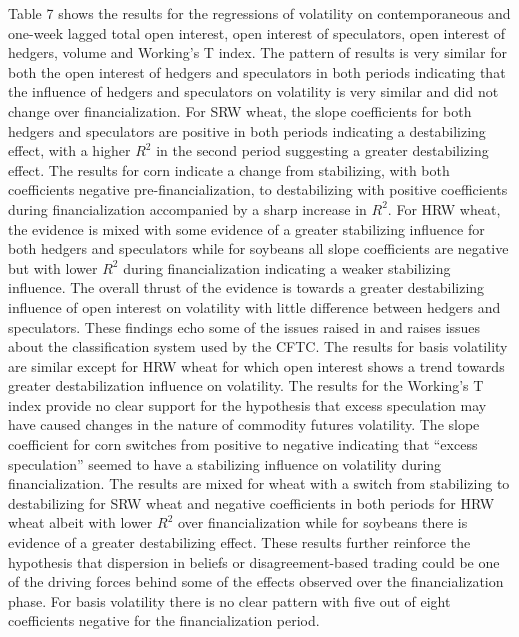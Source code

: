 \documentclass[
]{book}
\begin{document}
Table 7 shows the results for the regressions of volatility on contemporaneous and one-week lagged total open interest, open interest of speculators, open interest of hedgers, volume and Working's T index. The pattern of results is very similar for both the open interest of hedgers and speculators in both periods indicating that the influence of hedgers and speculators on volatility is very similar and did not change over financialization. For SRW wheat, the slope coefficients for both hedgers and speculators are positive in both periods indicating a destabilizing effect, with a higher \(R^{2}\) in the second period suggesting a greater destabilizing effect. The results for corn indicate a change from stabilizing, with both coefficients negative pre-financialization, to destabilizing with positive coefficients during financialization accompanied by a sharp increase in \(R^{2}\). For HRW wheat, the evidence is mixed with some evidence of a greater stabilizing influence for both hedgers and speculators while for soybeans all slope coefficients are negative but with lower \(R^{2}\) during financialization indicating a weaker stabilizing influence. The overall thrust of the evidence is towards a greater destabilizing influence of open interest on volatility with little difference between hedgers and speculators. These findings echo some of the issues raised in \citet{cheng_why_2014} and raises issues about the classification system used by the CFTC. The results for basis volatility are similar except for HRW wheat for which open interest shows a trend towards greater destabilization influence on volatility. The results for the Working's T index provide no clear support for the hypothesis that excess speculation may have caused changes in the nature of commodity futures volatility. The slope coefficient for corn switches from positive to negative indicating that ``excess speculation'' seemed to have a stabilizing influence on volatility during financialization. The results are mixed for wheat with a switch from stabilizing to destabilizing for SRW wheat and negative coefficients in both periods for HRW wheat albeit with lower \(R^{2}\) over financialization while for soybeans there is evidence of a greater destabilizing effect. These results further reinforce the hypothesis that dispersion in beliefs or disagreement-based trading \citep{stout_uncertainty_2011} could be one of the driving forces behind some of the effects observed over the financialization phase. For basis volatility there is no clear pattern with five out of eight coefficients negative for the financialization period.
\end{document}
